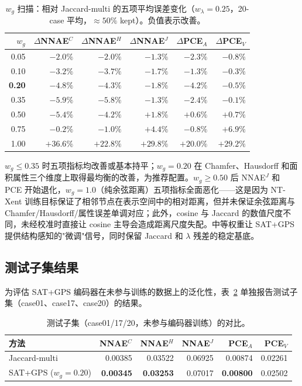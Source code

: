 \documentclass[twocolumn, a4paper, 10pt]{article}
\begin{document}
\begin{table}[h]
\centering
\scriptsize
\caption{$w_g$ 扫描：相对 Jaccard-multi 的五项平均误差变化（$w_\lambda{=}0.25$，20-case 平均，$\approx 50\%$ kept）。负值表示改善。}
\label{tab:weight-sweep}
\begin{tabular}{@{}rrrrrr@{}}
\hline
$w_g$ & $\Delta$NNAE$^C$ & $\Delta$NNAE$^H$ & $\Delta$NNAE$^J$ & $\Delta$PCE$_A$ & $\Delta$PCE$_V$ \\
\hline
0.05 & $-2.0\%$ & $-2.0\%$ & $-1.3\%$ & $-2.3\%$ & $-0.8\%$ \\
0.10 & $-3.2\%$ & $-3.7\%$ & $-1.7\%$ & $-1.3\%$ & $-0.3\%$ \\
\textbf{0.20} & $\mathbf{-4.8\%}$ & $\mathbf{-4.3\%}$ & $\mathbf{-1.8\%}$ & $\mathbf{-4.2\%}$ & $\mathbf{-0.5\%}$ \\
0.35 & $-5.9\%$ & $-5.8\%$ & $-1.3\%$ & $-2.4\%$ & $-0.1\%$ \\
0.50 & $-5.4\%$ & $-4.2\%$ & $+1.8\%$ & $+0.6\%$ & $+0.7\%$ \\
0.75 & $-0.2\%$ & $-1.0\%$ & $+4.4\%$ & $-0.8\%$ & $+6.9\%$ \\
1.00 & $+36.6\%$ & $+22.8\%$ & $+29.8\%$ & $+20.0\%$ & $+29.2\%$ \\
\hline
\end{tabular}
\end{table}

$w_g{\leq}0.35$ 时五项指标均改善或基本持平；$w_g{=}0.20$ 在 Chamfer、Hausdorff 和面积属性三个维度上取得最均衡的改善，为推荐配置。$w_g{\geq}0.50$ 后 NNAE$^J$ 和 PCE 开始退化，$w_g{=}1.0$（纯余弦距离）五项指标全面恶化——这是因为 NT-Xent 训练目标保证了相邻节点在表示空间中的相对距离，但并未保证余弦距离与 Chamfer/Hausdorff/属性误差单调对应；此外，cosine 与 Jaccard 的数值尺度不同，未经校准时直接让 cosine 主导会造成距离尺度失配。中等权重让 SAT+GPS 提供结构感知的"微调"信号，同时保留 Jaccard 和 $\lambda$ 残差的稳定基底。

\subsection{测试子集结果}
\label{sec:exp-test-subset}

为评估 SAT+GPS 编码器在未参与训练的数据上的泛化性，表~\ref{tab:test-subset} 单独报告测试子集（case01、case17、case20）的结果。

\begin{table}[h]
\centering
\scriptsize
\caption{测试子集（case01/17/20，未参与编码器训练）的对比。}
\label{tab:test-subset}
\begin{tabular}{@{}lrrrrr@{}}
\hline
方法 & NNAE$^C$ & NNAE$^H$ & NNAE$^J$ & PCE$_A$ & PCE$_V$ \\
\hline
Jaccard-multi        & 0.00385 & 0.03522 & 0.06925 & 0.00874 & 0.02261 \\
SAT+GPS ($w_g{=}0.20$) & \textbf{0.00345} & \textbf{0.03253} & 0.07017 & \textbf{0.00800} & 0.02502 \\
\hline
\end{tabular}
\end{table}
\end{document}
